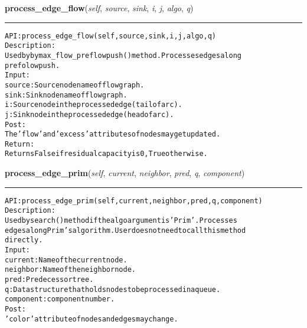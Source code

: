 \hspace{.8\funcindent}\begin{boxedminipage}{\funcwidth}

    \raggedright \textbf{process\_edge\_flow}(\textit{self}, \textit{source}, \textit{sink}, \textit{i}, \textit{j}, \textit{algo}, \textit{q})

    \vspace{-1.5ex}

    \rule{\textwidth}{0.5\fboxrule}
\setlength{\parskip}{2ex}
\begin{alltt}

API: process\_edge\_flow(self, source, sink, i, j, algo, q)
Description:
Used by by max\_flow\_preflowpush() method. Processes edges along
prefolow push.
Input:
    source: Source node name of flow graph.
    sink: Sink node name of flow graph.
    i: Source node in the processed edge (tail of arc).
    j: Sink node in the processed edge (head of arc).
Post:
    The 'flow' and 'excess' attributes of nodes may get updated.
Return:
    Returns False if residual capacity is 0, True otherwise.
\end{alltt}

\setlength{\parskip}{1ex}
    \end{boxedminipage}

    \label{coinor:gimpy:graph:Graph:process_edge_prim}

    \vspace{0.5ex}

\hspace{.8\funcindent}\begin{boxedminipage}{\funcwidth}

    \raggedright \textbf{process\_edge\_prim}(\textit{self}, \textit{current}, \textit{neighbor}, \textit{pred}, \textit{q}, \textit{component})

    \vspace{-1.5ex}

    \rule{\textwidth}{0.5\fboxrule}
\setlength{\parskip}{2ex}
\begin{alltt}

API: process\_edge\_prim(self, current, neighbor, pred, q, component)
Description:
Used by search() method if the algo argument is 'Prim'. Processes
edges along Prim's algorithm. User does not need to call this method
directly.
Input:
    current: Name of the current node.
    neighbor: Name of the neighbor node.
    pred: Predecessor tree.
    q: Data structure that holds nodes to be processed in a queue.
    component: component number.
Post:
    'color' attribute of nodes and edges may change.
\end{alltt}

\setlength{\parskip}{1ex}
    \end{boxedminipage}


